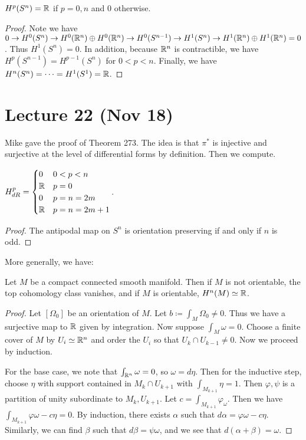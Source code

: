 \documentclass[twoside, 10pt]{article}
\begin{document}
    \begin{thm}
        $H^p(S^n) = \mathbb{R}$ if $p = 0,n$ and  $0$ otherwise.
    \end{thm}

    \begin{proof}
        Note we have $0 \to H^0(S^n) \to H^0(\mathbb{R}^n) \oplus H^0(\mathbb{R}^n) \to H^0(S^{n-1}) \to H^1(S^n) \to H^1(\mathbb{R}^n) \oplus H^1(\mathbb{R}^n) = 0$. Thus $H^1(S^n) = 0$.  In addition, because $\mathbb{R}^n$ is contractible, we have $H^p(S^{n-1}) = H^{p-1}(S^n)$ for $0 < p < n$. Finally, we have $H^n(S^n) = \cdots = H^1(S^1) = \mathbb{R}$.
    \end{proof}

    \section{Lecture 22 (Nov 18)}%
    \label{sec:lecture_22_nov_18_}
    
    Mike gave the proof of Theorem 273. The idea is that $\pi^*$ is injective and surjective at the level of differential forms by definition. Then we compute.

    \begin{cor}
        $H^p_{dR} = \begin{cases}
            0 & 0 < p < n \\
            \mathbb{R} & p = 0 \\
            0 & p=n=2m \\
            \mathbb{R} & p=n=2m+1
        \end{cases}$.
    \end{cor}

    \begin{proof}
        The antipodal map on $S^n$ is orientation preserving if and only if $n$ is odd.
    \end{proof}

    More generally, we have:
    \begin{thm}
        Let $M$ be a compact connected smooth manifold. Then if $M$ is not orientable, the top cohomology class vanishes, and if $M$ is orientable, $H^n(M) \simeq \mathbb{R}$.
    \end{thm}

    \begin{proof}
        Let $[\Omega_0]$ be an orientation of $M$. Let $b \coloneqq \int_M \Omega_0 \neq 0$. Thus we have a surjective map to $\mathbb{R}$ given by integration. Now suppose $\int_M \omega = 0$. Choose a finite cover of $M$ by $U_i \simeq \mathbb{R}^n$ and order the $U_i$ so that $U_k \cap U_{k-1} \neq 0$. Now we proceed by induction.

        For the base case, we note that $\int_{\mathbb{R}^n} \omega = 0$, so $\omega = d\eta$. Then for the inductive step, choose $\eta$ with support contained in $M_k \cap U_{k+1}$ with $\int_{M_{k+1}} \eta = 1$. Then $\varphi, \psi$ is a partition of unity subordinate to $M_k, U_{k+1}$. Let $c = \int_{M_{k+1}} \varphi_{\omega}$. Then we have $\int_{M_{k+1}} \varphi \omega - c \eta = 0$. By induction, there exists $\alpha$ such that $d\alpha = \varphi\omega - c\eta$. Similarly, we can find $\beta$ such that $d\beta = \psi \omega$, and we see that $d(\alpha+\beta) = \omega$.
    \end{proof}
\end{document}
